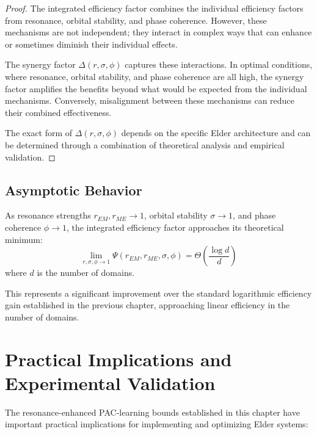 \begin{proof}
The integrated efficiency factor combines the individual efficiency factors from resonance, orbital stability, and phase coherence. However, these mechanisms are not independent; they interact in complex ways that can enhance or sometimes diminish their individual effects.

The synergy factor $\Delta(r, \sigma, \phi)$ captures these interactions. In optimal conditions, where resonance, orbital stability, and phase coherence are all high, the synergy factor amplifies the benefits beyond what would be expected from the individual mechanisms. Conversely, misalignment between these mechanisms can reduce their combined effectiveness.

The exact form of $\Delta(r, \sigma, \phi)$ depends on the specific Elder architecture and can be determined through a combination of theoretical analysis and empirical validation.
\end{proof}

\subsection{Asymptotic Behavior}

\begin{corollary}
As resonance strengths $r_{EM}, r_{ME} \to 1$, orbital stability $\sigma \to 1$, and phase coherence $\phi \to 1$, the integrated efficiency factor approaches its theoretical minimum:
\begin{equation}
\lim_{r, \sigma, \phi \to 1} \Psi(r_{EM}, r_{ME}, \sigma, \phi) = \Theta\left(\frac{\log d}{d}\right)
\end{equation}
where $d$ is the number of domains.
\end{corollary}

This represents a significant improvement over the standard logarithmic efficiency gain established in the previous chapter, approaching linear efficiency in the number of domains.

\section{Practical Implications and Experimental Validation}

The resonance-enhanced PAC-learning bounds established in this chapter have important practical implications for implementing and optimizing Elder systems:

